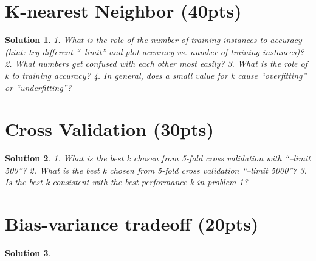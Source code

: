 \documentclass[11pt]{article}
\newtheorem*{solution*}{Solution}
\begin{document}
\thispagestyle{empty}

\newlength{\boxlength}\setlength{\boxlength}{\textwidth}
\addtolength{\boxlength}{-4mm}

\begin{center}
\end{center}




\section{K-nearest Neighbor (40pts)}

\begin{solution*}
	1. What is the role of the number of training instances to accuracy (hint: try different “--limit” and plot accuracy vs. number of training instances)?
	2. What numbers get confused with each other most easily?
	3. What is the role of k to training accuracy?
	4. In general, does a small value for k cause “overfitting” or “underfitting”?
\end{solution*}


\section{Cross Validation (30pts)}

\begin{solution*}
	1. What is the best k chosen from 5-fold cross validation with “--limit 500”? 
	2. What is the best k chosen from 5-fold cross validation “--limit 5000”?
	3. Is the best k consistent with the best performance k in problem 1?
\end{solution*}

\section{Bias-variance tradeoff (20pts)}

\begin{solution*}
	
\end{solution*}
\end{document}
